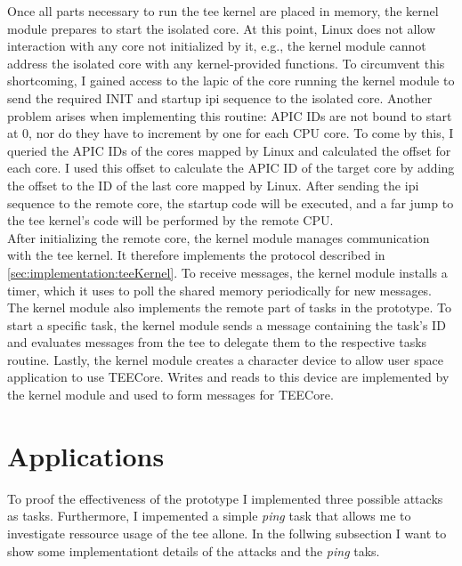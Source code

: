 Once all parts necessary to run the \gls{tee} kernel are placed in memory, the
kernel module prepares to start the isolated core. At this point, Linux does not
allow interaction with any core not initialized by it, e.g., the kernel module
cannot address the isolated core with any kernel-provided functions. To
circumvent this shortcoming, I gained access to the \gls{lapic} of the core
running the kernel module to send the required INIT and startup \gls{ipi}
sequence to the isolated core. Another problem arises when implementing this
routine: APIC IDs are not bound to start at 0, nor do they have to increment by
one for each CPU core. To come by this, I queried the APIC IDs of the cores
mapped by Linux and calculated the offset for each core. I used this offset to
calculate the APIC ID of the target core by adding the offset to the ID of the
last core mapped by Linux. After sending the \gls{ipi} sequence to the remote
core, the startup code will be executed, and a far jump to the \gls{tee}
kernel's code will be performed by the remote CPU.\\

After initializing the remote core, the kernel module manages communication with
the \gls{tee} kernel. It therefore implements the protocol described in
\ref{sec:implementation:teeKernel}. To receive messages, the kernel module
installs a timer, which it uses to poll the shared memory periodically for new
messages. The kernel module also implements the remote part of tasks in the
prototype. To start a specific task, the kernel module sends a message
containing the task's ID and evaluates messages from the \gls{tee} to delegate
them to the respective tasks routine. Lastly, the kernel module creates a
character device to allow user space application to use TEECore. Writes and
reads to this device are implemented by the kernel module and used to form
messages for TEECore.

\section{Applications}
\label{sec:implementation:attacks}
To proof the effectiveness of the prototype I implemented three possible attacks
as tasks. Furthermore, I impemented a simple \textit{ping} task that allows me
to investigate ressource usage of the \gls{tee} allone. In the follwing
subsection I want to show some implementationt details of the attacks and the
\textit{ping} taks.

